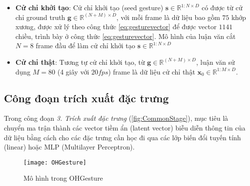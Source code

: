 \begin{itemize}
		\item \textbf{Cử chỉ khởi tạo}: Cử chỉ khởi tạo (seed gesture) $\mathbf{s} \in \mathbb{R}^{1:N \times D}$ có được từ cử chỉ ground truth $
		\mathbf{g} \in \mathbb{R}^{(N+M) \times D}$, với mỗi frame là dữ liệu bao gồm $75$ khớp xương, được xử lý theo công thức \autoref{eq:gesturevector} để được vector $1141$ chiều, trình bày ở công thức \autoref{eq:gesturevector}. Mô hình của luận văn cắt $N = 8$ frame đầu để làm cử chỉ khởi tạo $\mathbf{s} \in \mathbb{R}^{1:N \times D} $
		
		\item \textbf{Cử chỉ thật}: Tương tự cử chỉ khởi tạo, từ $
		\mathbf{g} \in \mathbb{R}^{(N+M) \times D}$, luận văn sử dụng $M = 80$ (4 giây với $20fps$) frame là dữ liệu cử chỉ thật $\mathbf{x}_{0} \in \mathbb{R}^{1:M \times D}$. 
\end{itemize}

\subsection{Công đoạn trích xuất đặc trưng}
\label{subsec:feature_extraction}

Trong công đoạn \textit{3. Trích xuất đặc trưng} (\autoref{fig:CommonStage}), mục tiêu là chuyển ma trận thành các vector tiềm ẩn (latent vector) biễu diễn thông tin của dữ liệu bằng cách cho các đặc trưng cần học đi qua các lớp biến đổi tuyến tính (linear) hoặc MLP (Multilayer Perceptron).

\begin{figure}[H]
	\centering
	\texttt{[image: OHGesture]}
	\caption{Mô hình trong OHGesture}
	\label{fig:OHGesture}
\end{figure}
\vspace{-10pt}

